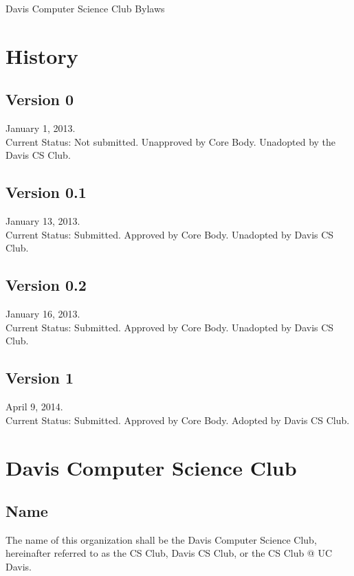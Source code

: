 \documentclass{article}
\begin{document}

\Large{Davis Computer Science Club Bylaws}
\normalsize{}

\pagebreak

\section*{History}
\subsection*{Version 0}
January 1, 2013.\\
Current Status: Not submitted. Unapproved by Core Body. Unadopted by the Davis CS Club.
\subsection*{Version 0.1}
January 13, 2013.\\
Current Status: Submitted. Approved by Core Body. Unadopted by Davis CS Club.
\subsection*{Version 0.2}
January 16, 2013.\\
Current Status: Submitted. Approved by Core Body. Unadopted by Davis CS Club.
\subsection*{Version 1}
April 9, 2014.\\
Current Status: Submitted. Approved by Core Body. Adopted by Davis CS Club.

\pagebreak

\tableofcontents
\newpage

\singlespacing
\sectionfont{\Large}
\subsectionfont{\large}

\section{Davis Computer Science Club}
\subsection{Name}
The name of this organization shall be the Davis Computer Science Club, hereinafter referred to as the CS Club, Davis CS Club, or the CS Club @ UC Davis.
\end{document}
